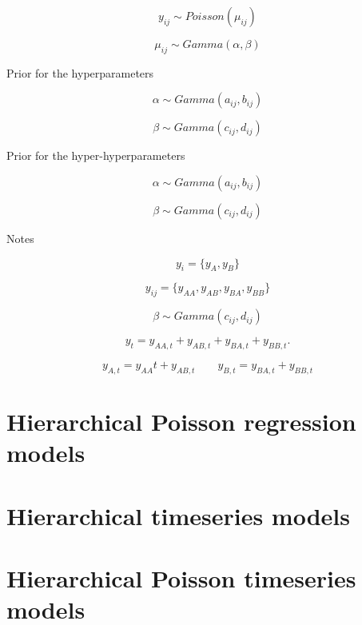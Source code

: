 	\begin{equation}\nonumber
	y_{ij} \sim Poisson(\mu_{ij}) 
	\end{equation}

	\begin{equation}\nonumber
	\mu_{ij} \sim Gamma(\alpha,\beta) 
	\end{equation}

	Prior for the hyperparameters

	\begin{equation}\nonumber
	\alpha \sim Gamma(a_{ij},b_{ij}) 
	\end{equation}

	\begin{equation}\nonumber
	\beta \sim Gamma(c_{ij},d_{ij}) 
	\end{equation}
	
	Prior for the hyper-hyperparameters

	\begin{equation}\nonumber
	\alpha \sim Gamma(a_{ij},b_{ij}) 
	\end{equation}

	\begin{equation}\nonumber
	\beta \sim Gamma(c_{ij},d_{ij}) 
	\end{equation}

Notes

\begin{equation*}
y_i = \{y_A,y_B\}
\end{equation*}

\begin{equation*}
y_{ij} = \{y_{AA},y_{AB},y_{BA},y_{BB}\}
\end{equation*}

\begin{equation*}
\beta \sim Gamma(c_{ij},d_{ij}) 
\end{equation*}

\begin{equation*}
y_{t}=y_{AA,t}+y_{AB,t}+y_{BA,t}+y_{BB,t}.
\end{equation*}

\begin{equation*} y_{A,t}=y_{AA}{t}+y_{AB,t}\quad \quad y_{B,t}=y_{BA,t}+y_{BB,t}
\tag{10.4}
\end{equation*}

\section{Hierarchical Poisson regression models}
\section{Hierarchical timeseries models}


\section{Hierarchical Poisson timeseries models}


\begin{equation*}
\end{equation*}





